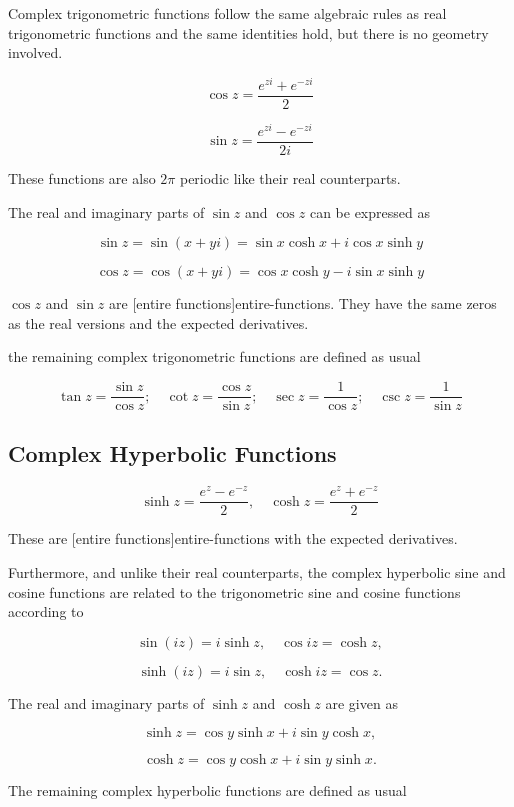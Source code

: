 \documentclass{article}
\begin{document}
Complex trigonometric functions follow the same algebraic rules as real trigonometric functions and the same identities hold, but there is no geometry involved.

\[ \cos{z} = \frac{e^{zi} + e^{-zi}}{2} \]

\[ \sin{z} = \frac{e^{zi} - e^{-zi}}{2i} \]

These functions are also $2 \pi$ periodic like their real counterparts.

The real and imaginary parts of $\sin{z}$ and $\cos{z}$ can be expressed as

\[ \sin{z} = \sin{(x + yi)} = \sin{x} \cosh{x} + i \cos{x}\sinh{y} \]

\[ \cos{z} = \cos{(x + yi)} = \cos{x} \cosh{y} - i \sin{x} \sinh{y} \]

$\cos{z}$ and $\sin{z}$ are \@[entire functions]{entire-functions}. They have the same zeros as the real versions and the expected derivatives.

the remaining complex trigonometric functions are defined as usual

\[ \tan{z} = \frac{\sin{z}}{\cos{z}}; \quad \cot{z} = \frac{\cos{z}}{\sin{z}}; \quad \sec{z} = \frac{1}{\cos{z}}; \quad \csc{z} = \frac{1}{\sin{z}} \]

\subsection{Complex Hyperbolic Functions}

\[ \sinh{z} = \frac{e^z - e^{-z}}{2}, \quad \cosh{z} = \frac{e^z + e^{-z}}{2} \]

These are \@[entire functions]{entire-functions} with the expected derivatives.

Furthermore, and unlike their real counterparts, the complex hyperbolic sine and cosine functions are related to the trigonometric sine and cosine functions according to

\[ \sin{(iz)} = i\sinh{z}, \quad \cos{iz} = \cosh{z}, \]

\[ \sinh{(iz)} = i\sin{z}, \quad \cosh{iz} = \cos{z}. \]

The real and imaginary parts of $\sinh{z}$ and $\cosh{z}$ are given as

\[ \sinh{z} = \cos{y} \sinh{x} + i \sin{y} \cosh{x}, \]

\[ \cosh{z} = \cos{y} \cosh{x} + i \sin{y} \sinh{x}. \]

The remaining complex hyperbolic functions are defined as usual
\end{document}
